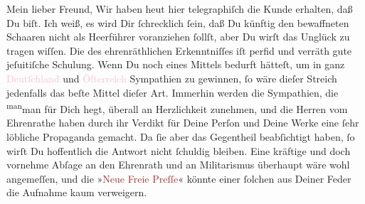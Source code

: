 \pstart\center{}Mein lieber Freund,\pend
\pstart
           Wir haben heut hier telegraphiſch die Kunde erhalten,
               daß Du \label{K_L03070-1v}\label{K_L03070-1h}
               biſt.  Ich weiß, es wird Dir ſchrecklich ſein,
               daß Du künftig den bewaffneten Schaaren nicht als Heerführer voranziehen ſollſt, aber
               Du wirſt das Unglück zu tragen wiſſen. Die \label{K_L03070-2v}\label{K_L03070-2h} des ehrenräthlichen
               Erkenntniſſes iſt perfid und verräth gute jeſuitiſche Schulung. Wenn Du noch eines
               Mittels bedurft {\pb}hätteſt, um in ganz \textcolor{pink}{Deutſchland}{}\ledrightnote{\textcolor{pink}{Deutschland}} und \textcolor{pink}{Öſterreich}{}\ledrightnote{\textcolor{pink}{Österreich}} Sympathien zu gewinnen, ſo wäre dieſer Streich jedenfalls das
               beſte Mittel dieſer Art. Immerhin werden die Sympathien, die \substVorne{}\textsuperscript{man}\substDazwischen{}man\substHinten{} für Dich hegt, überall an Herzlichkeit zunehmen, und die Herren vom
               Ehrenrathe haben durch ihr Verdikt für Deine Perſon und Deine Werke eine ſehr
               löbliche Propaganda gemacht. Da ſie aber das Gegentheil beabſichtigt haben, {\pb}ſo wirſt Du hoffentlich die Antwort \strikeout{\textcolor{gray}{n}} nicht ſchuldig bleiben. Eine kräftige und doch vornehme Abſage an den \strikeout{\textcolor{gray}{ge}} Ehrenrath und an Militarismus überhaupt wäre wohl angemeſſen, und die »\textcolor{brown}{Neue Freie Preſſe}{}\ledrightnote{\textcolor{brown}{Neue Freie Presse}}« könnte einer ſolchen \label{K_L03070-4v}\label{K_L03070-4h} aus Deiner Feder die Aufnahme
               kaum verweigern.\pend
           
